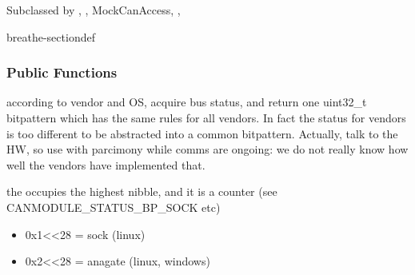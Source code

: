 \documentclass[a4paper,10pt,english]{sphinxmanual}
\begin{document}
\begin{fulllineitems}
%
\pysigstartmultiline
{}%
\pysigstopmultiline
\sphinxAtStartPar
Subclassed by {\hyperref[\detokenize{classesdetails:classAnaCanScan}]{}}, {\hyperref[\detokenize{vendors/systec:classCSockCanScan}]{}}, MockCanAccess, {\hyperref[\detokenize{vendors/peak:classPKCanScan}]{}}, {\hyperref[\detokenize{classesdetails:classSTCanScan}]{}}

\begin{sphinxuseclass}{breathe-sectiondef}\subsubsection*{Public Functions}

\begin{fulllineitems}
\label{\detokenize{canports:_CPPv4N9CanModule10CCanAccess13getPortStatusEv}}%
\pysigstartmultiline
{}%
\pysigstopmultiline
\sphinxAtStartPar
according to vendor and OS, acquire bus status, and return one uint32\_t bitpattern which has the same rules for all vendors. In fact the status for vendors is too different to be abstracted into a common bitpattern. Actually, talk to the HW, so use with parcimony while comms are ongoing: we do not really know how well the vendors have implemented that.

\sphinxAtStartPar
the  occupies the highest nibble, and it is a counter (see CANMODULE\_STATUS\_BP\_SOCK etc)\begin{itemize}
\item {} 
\sphinxAtStartPar
0x1\textless{}\textless{}28 = sock (linux)

\item {} 
\sphinxAtStartPar
0x2\textless{}\textless{}28 = anagate (linux, windows)


\end{itemize}
\end{fulllineitems}
\end{sphinxuseclass}
\end{fulllineitems}
\end{document}
